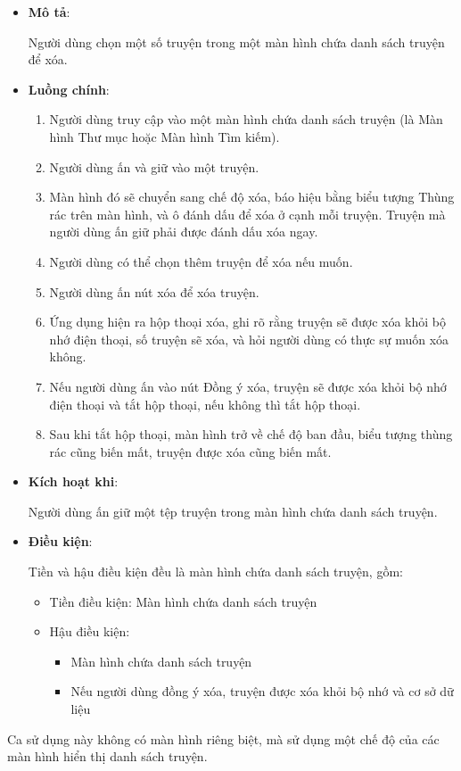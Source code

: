 \documentclass[../../thesis]{subfiles}
\begin{document}
\begin{itemize}
    \item
        \textbf{Mô tả}:

        Người dùng chọn một số truyện trong một màn hình chứa danh sách truyện
        để xóa.
    \item
        \textbf{Luồng chính}:

        \begin{enumerate}
            \item
                Người dùng truy cập vào một màn hình chứa danh sách truyện (là
                Màn hình Thư mục hoặc Màn hình Tìm kiếm).
            \item
                Người dùng ấn và giữ vào một truyện.
            \item
                Màn hình đó sẽ chuyển sang chế độ xóa, báo hiệu bằng biểu tượng
                Thùng rác trên màn hình, và ô đánh dấu để xóa ở cạnh mỗi truyện.
                Truyện mà người dùng ấn giữ phải được đánh dấu xóa ngay.
            \item
                Người dùng có thể chọn thêm truyện để xóa nếu muốn.
            \item
                Người dùng ấn nút xóa để xóa truyện.
            \item
                Ứng dụng hiện ra hộp thoại xóa, ghi rõ rằng truyện sẽ được xóa
                khỏi bộ nhớ điện thoại, số truyện sẽ xóa, và hỏi người dùng có
                thực sự muốn xóa không.
            \item
                Nếu người dùng ấn vào nút Đồng ý xóa, truyện sẽ được xóa khỏi bộ
                nhớ điện thoại và tắt hộp thoại, nếu không thì tắt hộp thoại.
            \item
                Sau khi tắt hộp thoại, màn hình trở về chế độ ban đầu, biểu
                tượng thùng rác cũng biến mất, truyện được xóa cũng biến mất.
        \end{enumerate}
    \item
        \textbf{Kích hoạt khi}:

        Người dùng ấn giữ một tệp truyện trong màn hình chứa danh sách truyện.
    \item
        \textbf{Điều kiện}:

        Tiền và hậu điều kiện đều là màn hình chứa danh sách truyện, gồm:

        \begin{itemize}
            \item
                Tiền điều kiện: Màn hình chứa danh sách truyện
            \item
                Hậu điều kiện:

                \begin{itemize}
                    \item Màn hình chứa danh sách truyện
                    \item Nếu người dùng đồng ý xóa, truyện được xóa khỏi bộ nhớ
                        và cơ sở dữ liệu
                \end{itemize}
        \end{itemize}
\end{itemize}

Ca sử dụng này không có màn hình riêng biệt, mà sử dụng một chế độ của các màn
hình hiển thị danh sách truyện.
\end{document}
